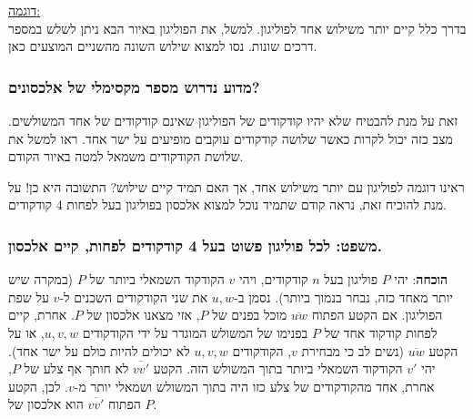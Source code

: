 \documentclass[
]{book}
\begin{document}
\ul{דוגמה:\\
}בדרך כלל קיים יותר משילוש אחד לפוליגון. למשל, את הפוליגון באיור הבא ניתן לשלש במספר דרכים שונות. נסו למצוא שילוש השונה מהשניים המוצעים כאן.

\hypertarget{ux5deux5d3ux5d5ux5e2-ux5e0ux5d3ux5e8ux5d5ux5e9-ux5deux5e1ux5e4ux5e8-ux5deux5e7ux5e1ux5d9ux5deux5dcux5d9-ux5e9ux5dc-ux5d0ux5dcux5dbux5e1ux5d5ux5e0ux5d9ux5dd}{%
\subsubsection*{מדוע נדרוש מספר מקסימלי של אלכסונים?}\label{ux5deux5d3ux5d5ux5e2-ux5e0ux5d3ux5e8ux5d5ux5e9-ux5deux5e1ux5e4ux5e8-ux5deux5e7ux5e1ux5d9ux5deux5dcux5d9-ux5e9ux5dc-ux5d0ux5dcux5dbux5e1ux5d5ux5e0ux5d9ux5dd}}

זאת על מנת להבטיח שלא יהיו קודקודים של הפוליגון שאינם קודקודים של אחד המשולשים. מצב כזה יכול לקרות כאשר שלושה קודקודים עוקבים מופיעים על ישר אחד. ראו למשל את שלושת הקודקודים משמאל למטה באיור הקודם.

ראינו דוגמה לפוליגון עם יותר משילוש אחד, אך האם תמיד קיים שילוש? התשובה היא כן! על מנת להוכיח זאת, נראה קודם שתמיד נוכל למצוא אלכסון בפוליגון בעל לפחות 4 קודקודים.

\hypertarget{ux5deux5e9ux5e4ux5d8-ux5dcux5dbux5dc-ux5e4ux5d5ux5dcux5d9ux5d2ux5d5ux5df-ux5e4ux5e9ux5d5ux5d8-ux5d1ux5e2ux5dc-4-ux5e7ux5d5ux5d3ux5e7ux5d5ux5d3ux5d9ux5dd-ux5dcux5e4ux5d7ux5d5ux5ea-ux5e7ux5d9ux5d9ux5dd-ux5d0ux5dcux5dbux5e1ux5d5ux5df.}{%
\subsubsection*{משפט: לכל פוליגון פשוט בעל 4 קודקודים לפחות, קיים אלכסון.}\label{ux5deux5e9ux5e4ux5d8-ux5dcux5dbux5dc-ux5e4ux5d5ux5dcux5d9ux5d2ux5d5ux5df-ux5e4ux5e9ux5d5ux5d8-ux5d1ux5e2ux5dc-4-ux5e7ux5d5ux5d3ux5e7ux5d5ux5d3ux5d9ux5dd-ux5dcux5e4ux5d7ux5d5ux5ea-ux5e7ux5d9ux5d9ux5dd-ux5d0ux5dcux5dbux5e1ux5d5ux5df.}}

\textbf{הוכחה}: יהי \(P\) פוליגון בעל \(n\) קודקודים, ויהי \(v\) הקודקוד השמאלי ביותר של \(P\) (במקרה שיש יותר מאחד כזה, נבחר בנמוך ביותר). נסמן ב-\(u,w\) את שני הקודקודים השכנים ל-\(v\) על שפת הפוליגון. אם הקטע הפתוח \(\overline{u w}\) מוכל בפנים של \(P\), אזי מצאנו אלכסון של \(P\). אחרת, קיים לפחות קודקוד אחד של \(P\) בפנימו של המשולש המוגדר על ידי הקודקודים \(u,v,w\), או על הקטע \(\overline{u w}\) (נשים לב כי מבחירת \(v\), הקודקודים \(u, v, w\) לא יכולים להיות כולם על ישר אחד). יהי \(v'\) הקודקוד השמאלי ביותר בתוך המשולש הזה. הקטע \(\overline{v v'}\) לא חותך אף צלע של \(P\), אחרת, אחד מהקודקודים של צלע כזו היה בתוך המשולש ושמאלי יותר מ-\(v\). לכן, הקטע הפתוח \(\overline{v v'}\) הוא אלכסון של \(P\).
\end{document}
